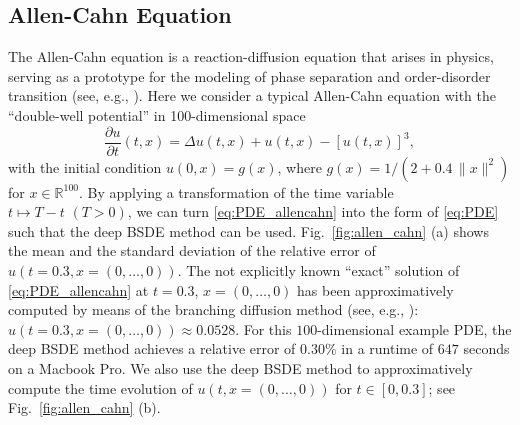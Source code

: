 \documentclass[11pt,english]{article}
\providecommand{\R}{{\ensuremath{\mathbb{R}}}}
\begin{document}
\subsection*{Allen-Cahn Equation}
The Allen-Cahn equation is a reaction-diffusion equation that arises in physics, serving as a 
prototype for the modeling of phase separation and order-disorder transition (see, e.g., \cite{Emmerich2003}).
Here we consider a typical Allen-Cahn equation with the ``double-well potential'' in 100-dimensional space
\begin{equation}
  \label{eq:PDE_allencahn}
     \frac{ \partial u}{ \partial t } ( t, x )
  =  \Delta u (t,x) + u(t,x) - \left[ u(t,x) \right]^3,
\end{equation}
with the initial condition $u(0,x) = g(x)$,
where $g(x)=1/\left(2 + 0.4\, \| x \|^2\right)$ for $ x \in \R^{ 100 } $. By applying a transformation of the time 
variable $t\mapsto T-t \,\,(T>0)$, we can turn \eqref{eq:PDE_allencahn} into the form of \eqref{eq:PDE} 
such that the deep BSDE method can be used. 
Fig.\ \ref{fig:allen_cahn} (a) shows the mean and the standard deviation of the relative 
error of $ u(t{=}0.3,x{=}(0,\dots, 0))$.
The not explicitly known ``exact'' 
solution of \eqref{eq:PDE_allencahn} at $ t = 0.3 $, $ x =(0,\dots,0) $ 
has been approximatively computed by means of 
the branching diffusion method (see, e.g., \cite{Henry-Labordere2012,Henry-Labordere2014}):
$ u( t{=}0.3, x{=}(0, \dots, 0) ) \approx 0.0528$.
For this $ 100 $-dimensional example PDE, the deep BSDE method achieves a relative error of $ 0.30\% $ 
in a runtime of $ 647 $ seconds on a Macbook Pro.
We also use the deep BSDE method to approximatively compute 
the time evolution of $ u(t,x{=}(0,\dots,0)) $ for $ t \in [0,0.3] $; see Fig.\ \ref{fig:allen_cahn} (b).
\end{document}
